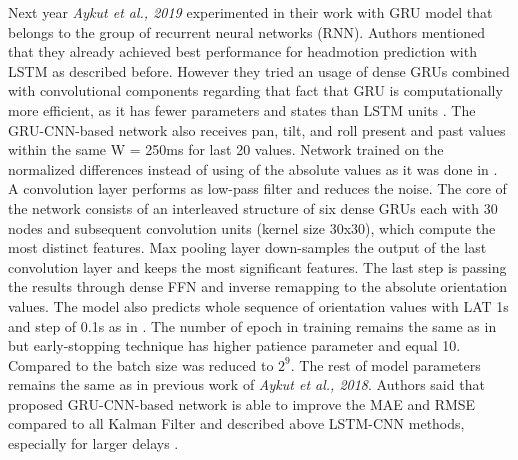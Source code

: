 Next year \textit{Aykut et al., 2019} experimented in their work \cite{telepresence} with GRU model that belongs to the group of recurrent neural networks (RNN). Authors mentioned that they already achieved best performance for headmotion prediction with LSTM as described before. However they tried an usage of dense GRUs combined with convolutional components regarding that fact that GRU is computationally more efficient, as it has fewer parameters and states than LSTM units \cite{telepresence}. The GRU-CNN-based network also receives pan, tilt, and roll present and past values within the same W = 250ms for last 20 values. Network trained on the normalized differences instead of using of the absolute values as it was done in \cite{delay_compensation_360}. A convolution layer performs as low-pass filter and reduces the noise. The core of the network consists of an interleaved structure of six dense GRUs each with 30 nodes and subsequent convolution units (kernel size 30x30), which compute the most distinct features. Max pooling layer down-samples the output of the last convolution layer and keeps the most significant features. The last step is passing the results through dense FFN and inverse remapping to the absolute orientation values. The model also predicts whole sequence of orientation values with LAT 1s and step of 0.1s as in \cite{telepresence}. The number of epoch in training remains the same as in \cite{delay_compensation_360} but early-stopping technique has higher patience parameter and equal 10. Compared to \cite{delay_compensation_360} the batch size was reduced to $2^{9}$. The rest of model parameters remains the same as in previous work of \textit{Aykut et al., 2018}. Authors said that proposed GRU-CNN-based network is able to improve the MAE and RMSE compared to all Kalman Filter and described above LSTM-CNN methods, especially for larger delays \cite{telepresence}. \\
